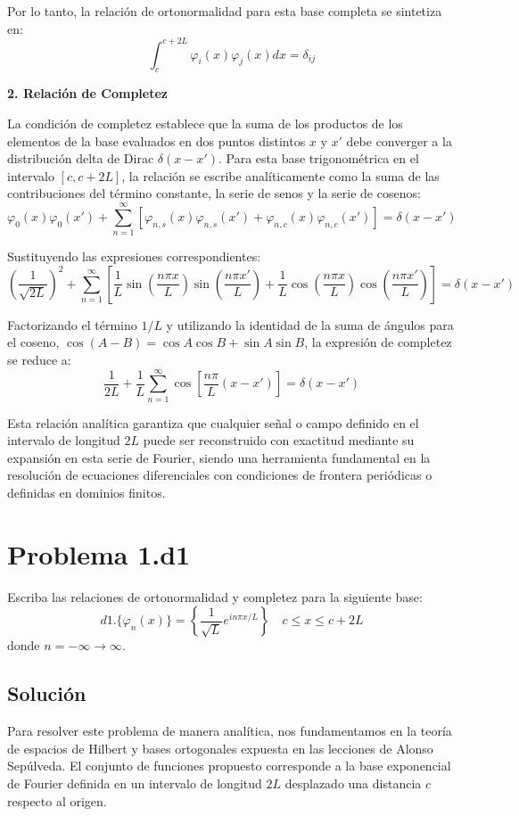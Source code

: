 \documentclass[a4paper]{article}
\begin{document}
Por lo tanto, la relación de ortonormalidad para esta base completa se sintetiza en:
$$ \int_{c}^{c+2L} \varphi_i(x) \varphi_j(x) dx = \delta_{ij} $$

\textbf{2. Relación de Completez}

La condición de completez establece que la suma de los productos de los elementos de la base evaluados en dos puntos distintos $x$ y $x'$ debe converger a la distribución delta de Dirac $\delta(x - x')$. Para esta base trigonométrica en el intervalo $[c, c+2L]$, la relación se escribe analíticamente como la suma de las contribuciones del término constante, la serie de senos y la serie de cosenos:
$$ \varphi_0(x)\varphi_0(x') + \sum_{n=1}^{\infty} \left[ \varphi_{n,s}(x)\varphi_{n,s}(x') + \varphi_{n,c}(x)\varphi_{n,c}(x') \right] = \delta(x - x') $$

Sustituyendo las expresiones correspondientes:
$$ \left(\frac{1}{\sqrt{2L}}\right)^2 + \sum_{n=1}^{\infty} \left[ \frac{1}{L} \sin\left(\frac{n\pi x}{L}\right) \sin\left(\frac{n\pi x'}{L}\right) + \frac{1}{L} \cos\left(\frac{n\pi x}{L}\right) \cos\left(\frac{n\pi x'}{L}\right) \right] = \delta(x - x') $$

Factorizando el término $1/L$ y utilizando la identidad de la suma de ángulos para el coseno, $\cos(A-B) = \cos A \cos B + \sin A \sin B$, la expresión de completez se reduce a:
$$ \frac{1}{2L} + \frac{1}{L} \sum_{n=1}^{\infty} \cos\left[ \frac{n\pi}{L}(x - x') \right] = \delta(x - x') $$

Esta relación analítica garantiza que cualquier señal o campo definido en el intervalo de longitud $2L$ puede ser reconstruido con exactitud mediante su expansión en esta serie de Fourier, siendo una herramienta fundamental en la resolución de ecuaciones diferenciales con condiciones de frontera periódicas o definidas en dominios finitos.


\section{Problema 1.d1}
Escriba las relaciones de ortonormalidad y completez para la siguiente base:
$$ d1. \{\varphi_n(x)\} = \left\{\frac{1}{\sqrt{L}} e^{in\pi x/L}\right\} \quad c \leq x \leq c+ 2L $$
donde $n = -\infty \to \infty.$

\subsection{Solución}

Para resolver este problema de manera analítica, nos fundamentamos en la teoría de espacios de Hilbert y bases ortogonales expuesta en las lecciones de Alonso Sepúlveda. El conjunto de funciones propuesto corresponde a la base exponencial de Fourier definida en un intervalo de longitud $2L$ desplazado una distancia $c$ respecto al origen.
\end{document}
